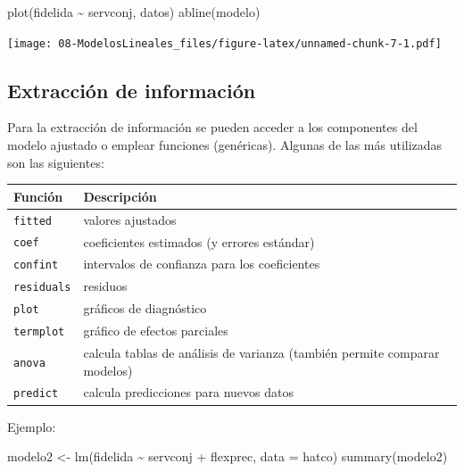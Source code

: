 \documentclass[
]{book}
\newenvironment{Shaded}{\begin{snugshade}}{\end{snugshade}}
\newcommand{\AttributeTok}[1]{\textcolor[rgb]{0.77,0.63,0.00}{#1}}
\newcommand{\FunctionTok}[1]{\textcolor[rgb]{0.00,0.00,0.00}{#1}}
\newcommand{\NormalTok}[1]{#1}
\newcommand{\OtherTok}[1]{\textcolor[rgb]{0.56,0.35,0.01}{#1}}
\newcommand{\SpecialCharTok}[1]{\textcolor[rgb]{0.00,0.00,0.00}{#1}}
\theoremstyle{break}
\begin{document}
\begin{Shaded}
\begin{Highlighting}[]
\FunctionTok{plot}\NormalTok{(fidelida }\SpecialCharTok{\textasciitilde{}}\NormalTok{ servconj, datos)}
\FunctionTok{abline}\NormalTok{(modelo)}
\end{Highlighting}
\end{Shaded}

\texttt{[image: 08-ModelosLineales\_files/figure-latex/unnamed-chunk-7-1.pdf]}

\hypertarget{extracciuxf3n-de-informaciuxf3n}{%
\subsection{Extracción de información}\label{extracciuxf3n-de-informaciuxf3n}}

Para la extracción de información se pueden acceder a los componentes del modelo ajustado o emplear funciones (genéricas). Algunas de las más utilizadas son las siguientes:

\begin{longtable}[]{@{}
  >{\raggedright\arraybackslash}p{}
  >{\raggedright\arraybackslash}p{}@{}}
\toprule
Función & Descripción \\
\midrule
\endhead
\texttt{fitted} & valores ajustados \\
\texttt{coef} & coeficientes estimados (y errores estándar) \\
\texttt{confint} & intervalos de confianza para los coeficientes \\
\texttt{residuals} & residuos \\
\texttt{plot} & gráficos de diagnóstico \\
\texttt{termplot} & gráfico de efectos parciales \\
\texttt{anova} & calcula tablas de análisis de varianza (también permite comparar modelos) \\
\texttt{predict} & calcula predicciones para nuevos datos \\
\bottomrule
\end{longtable}

Ejemplo:

\begin{Shaded}
\begin{Highlighting}[]
\NormalTok{modelo2 }\OtherTok{\textless{}{-}} \FunctionTok{lm}\NormalTok{(fidelida }\SpecialCharTok{\textasciitilde{}}\NormalTok{ servconj }\SpecialCharTok{+}\NormalTok{ flexprec, }\AttributeTok{data =}\NormalTok{ hatco)}
\FunctionTok{summary}\NormalTok{(modelo2)}
\end{Highlighting}
\end{Shaded}
\end{document}
